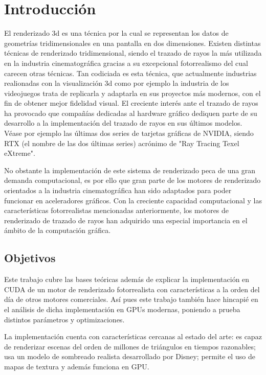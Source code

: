 \chapter{Introducción}
	
El renderizado 3d es una técnica por la cual se representan los datos de geometrías tridimensionales en una pantalla en dos dimensiones. Existen distintas técnicas de renderizado tridimensional, siendo el trazado de rayos la más utilizada en la industria cinematográfica gracias a su excepcional fotorrealismo del cual carecen otras técnicas. Tan codiciada es esta técnica, que actualmente industrias realionadas con la visualización 3d como por ejemplo la industria de los videojuegos trata de replicarla y adaptarla en sus proyectos más modernos, con el fin de obtener mejor fidelidad visual.
El creciente interés ante el trazado de rayos ha provocado que compañías dedicadas al hardware gráfico dediquen parte de su desarrollo a la implementación del trazado de rayos en sus últimos modelos. Véase por ejemplo las últimas dos series de tarjetas gráficas de NVIDIA, siendo RTX (el nombre de las dos últimas series) acrónimo de "Ray Tracing Texel eXtreme". 

No obstante la implementación de este sistema de renderizado peca de una gran demanda computacional, es por ello que gran parte de los motores de renderizado orientados a la industria cinematográfica han sido adaptados para poder funcionar en aceleradores gráficos. Con la creciente capacidad computacional y las características fotorrealistas mencionadas anteriormente, los motores de renderizado de trazado de rayos han adquirido una especial importancia en el ámbito de la computación gráfica.



\section{Objetivos}

Este trabajo cubre las bases teóricas además de explicar la implementación en CUDA de un motor de renderizado fotorrealista con características a la orden del día de otros motores comerciales. Así pues este trabajo también hace hincapié en el análisis de dicha implementación en GPUs modernas, poniendo a prueba distintos parámetros y optimizaciones.

La implementación cuenta con características cercanas al estado del arte: es capaz de renderizar escenas del orden de millones de triángulos en tiempos razonables; usa un modelo de sombreado realista desarrollado por Disney; permite el uso de mapas de textura y además funciona en GPU.

